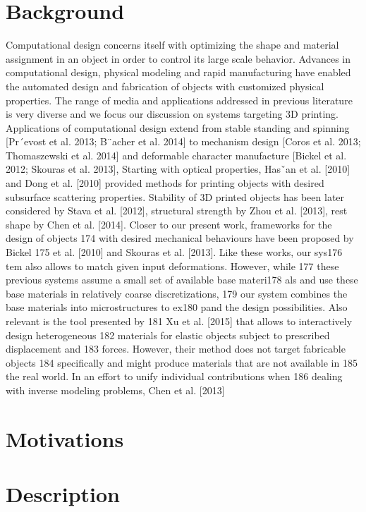 \section{Background}
Computational design concerns itself with optimizing the shape and material assignment in an object in order to control its large scale behavior.
Advances in computational design, physical modeling and rapid manufacturing 
have enabled the automated design and fabrication of objects with customized physical properties.
The range of media and applications addressed in previous literature is very diverse and we focus our discussion on systems targeting 3D printing.
Applications of computational design extend
from stable standing and spinning [Pr´evost et al. 2013; B¨acher et al.
2014] to mechanism design [Coros et al. 2013; Thomaszewski et al.
2014] and deformable character manufacture [Bickel et al. 2012;
Skouras et al. 2013],
Starting with optical properties, Hasˇan et al. [2010] and
Dong et al. [2010] provided methods for printing objects with desired subsurface scattering properties. Stability of 3D printed objects has been later considered by Stava et al. [2012], structural
strength by Zhou et al. [2013], rest shape by Chen et al. [2014].
Closer to our present work, frameworks for the design of objects
174 with desired mechanical behaviours have been proposed by Bickel
175 et al. [2010] and Skouras et al. [2013]. Like these works, our sys176
tem also allows to match given input deformations. However, while
177 these previous systems assume a small set of available base materi178
als and use these base materials in relatively coarse discretizations,
179 our system combines the base materials into microstructures to ex180
pand the design possibilities. Also relevant is the tool presented by
181 Xu et al. [2015] that allows to interactively design heterogeneous
182 materials for elastic objects subject to prescribed displacement and
183 forces. However, their method does not target fabricable objects
184 specifically and might produce materials that are not available in
185 the real world. In an effort to unify individual contributions when
186 dealing with inverse modeling problems, Chen et al. [2013]

\section{Motivations}


\section{Description}\label{ch1:desc}


